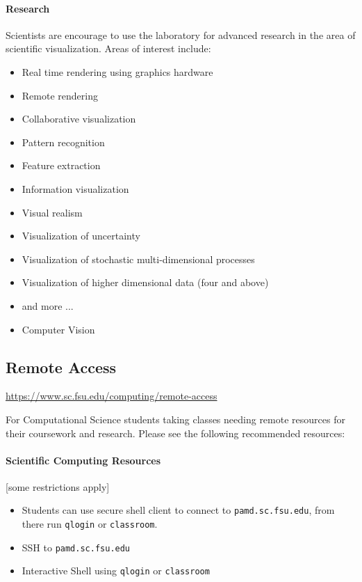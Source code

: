 \documentclass[12pt,a4paper]{article}
\begin{document}
\paragraph{Research}
Scientists are encourage to use the laboratory for advanced research in the area of scientific visualization. Areas of interest include:
\begin{itemize}
    \item Real time rendering using graphics hardware
    \item Remote rendering
    \item Collaborative visualization
    \item Pattern recognition
    \item Feature extraction
    \item Information visualization
    \item Visual realism
    \item Visualization of uncertainty
    \item Visualization of stochastic multi-dimensional processes
    \item Visualization of higher dimensional data (four and above)
    \item and more ...
    \item Computer Vision
\end{itemize}

\subsection{Remote Access}
\url{https://www.sc.fsu.edu/computing/remote-access}

For Computational Science students taking classes needing remote resources for their coursework and research. Please see the following recommended resources:

\paragraph{Scientific Computing Resources}
[some restrictions apply]
\begin{itemize}
    \item Students can use secure shell client to connect to \texttt{pamd.sc.fsu.edu}, from there run \texttt{qlogin} or \texttt{classroom}.
    \item SSH to \texttt{pamd.sc.fsu.edu}
    \item Interactive Shell using \texttt{qlogin} or \texttt{classroom}
\end{itemize}
\end{document}
